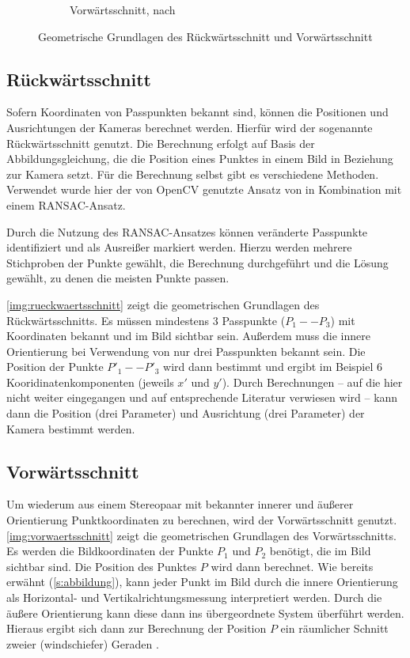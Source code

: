 \documentclass[./00PhotoBox.tex]{subfiles}
\begin{document}
\begin{figure}
\begin{subfigure}{0.45\textwidth}
        \centering
        \caption{Vorwärtsschnitt, nach \citealt[S. 339]{luhmann}} %
        \label{img:vorwaertsschnitt} %
    \end{subfigure}
    \caption{Geometrische Grundlagen des Rückwärtsschnitt und Vorwärtsschnitt} %
\end{figure}


\subsection{Rückwärtsschnitt}
Sofern Koordinaten von Passpunkten bekannt sind, können die Positionen und Ausrichtungen der Kameras berechnet werden. Hierfür wird der sogenannte Rückwärtsschnitt genutzt. Die Berechnung erfolgt auf Basis der Abbildungsgleichung, die die Position eines Punktes in einem Bild in Beziehung zur Kamera setzt. Für die Berechnung selbst gibt es verschiedene Methoden. Verwendet wurde hier der von OpenCV genutzte Ansatz von \cite{Lepetit2008} in Kombination mit einem RANSAC-Ansatz.

Durch die Nutzung des RANSAC-Ansatzes können veränderte Passpunkte identifiziert und als Ausreißer markiert werden. Hierzu werden mehrere Stichproben der Punkte gewählt, die Berechnung durchgeführt und die Lösung gewählt, zu denen die meisten Punkte passen. \citep[S. 134]{luhmann}

\autoref{img:rueckwaertsschnitt} zeigt die geometrischen Grundlagen des Rückwärtsschnitts. Es müssen mindestens 3 Passpunkte ($P_1 - - P_3$) mit Koordinaten bekannt und im Bild sichtbar sein. Außerdem muss die innere Orientierung bei Verwendung von nur drei Passpunkten bekannt sein. Die Position der Punkte $P'_1 - - P'_3$ wird dann bestimmt und ergibt im Beispiel 6 Kooridinatenkomponenten (jeweils $x'$ und $y'$). Durch Berechnungen -- auf die hier nicht weiter eingegangen und auf entsprechende Literatur verwiesen wird -- kann dann die Position (drei Parameter) und Ausrichtung (drei Parameter) der Kamera bestimmt werden. \citep[S. 284]{luhmann}

\subsection{Vorwärtsschnitt}
Um wiederum aus einem Stereopaar mit bekannter innerer und äußerer Orientierung Punktkoordinaten zu berechnen, wird der Vorwärtsschnitt genutzt. \autoref{img:vorwaertsschnitt} zeigt die geometrischen Grundlagen des Vorwärtsschnitts. Es werden die Bildkoordinaten der Punkte $P_1$ und $P_2$ benötigt, die im Bild sichtbar sind. Die Position des Punktes $P$ wird dann berechnet. Wie bereits erwähnt (\autoref{s:abbildung}), kann jeder Punkt im Bild durch die innere Orientierung als Horizontal- und Vertikalrichtungsmessung interpretiert werden. Durch die äußere Orientierung kann diese dann ins übergeordnete System überführt werden. Hieraus ergibt sich dann zur Berechnung der Position $P$ ein räumlicher Schnitt zweier (windschiefer) Geraden \citep[S. 95]{luhmann}.
\end{document}
